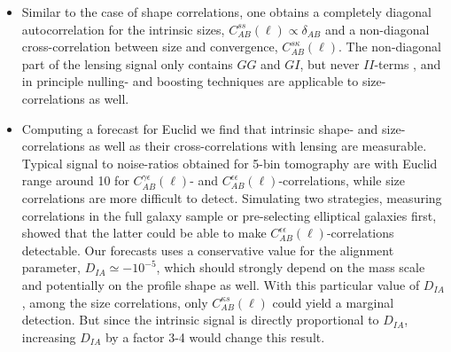 \documentclass[a4paper,fleqn,usenatbib]{mnras}
\begin{document}
\begin{itemize}
\item{Similar to the case of shape correlations, one obtains a completely diagonal autocorrelation for the intrinsic sizes, $C^{ss}_{AB}(\ell)\propto\delta_{AB}$ and a non-diagonal cross-correlation between size and convergence, $C^{s\kappa}_{AB}(\ell)$. The non-diagonal part of the lensing signal only contains $GG$ and $GI$, but never $II$-terms \citep{jain_cross-correlation_2003, takada_tomography_2004, huterer_nulling_2005}, and in principle nulling- and boosting techniques \citep{joachimi_removal_2009, 2010A&A...517A...4J, 2010arXiv1009.2024J} are applicable to size-correlations as well.}

\item{Computing a forecast for Euclid we find that intrinsic shape- and size-correlations as well as their cross-correlations with lensing are measurable. Typical signal to noise-ratios obtained for 5-bin tomography are with Euclid range around 10 for $C^{\gamma\epsilon}_{AB}(\ell)$- and $C^{\epsilon\epsilon}_{AB}(\ell)$-correlations, while size correlations are more difficult to detect. Simulating two strategies, measuring correlations in the full galaxy sample or pre-selecting elliptical galaxies first, showed that the latter could be able to make $C^{\epsilon\epsilon}_{AB}(\ell)$-correlations detectable. Our forecasts uses a conservative value for the alignment parameter, $D_{IA}\simeq -10^{-5}$, which should strongly depend on the mass scale \citep{piras_mass_2018} and potentially on the profile shape as well. With this particular value of $D_{IA}$, among the size correlations, only $C^{\kappa s}_{AB}(\ell)$ could yield a marginal detection. But since the intrinsic signal is directly proportional to $D_{IA}$, increasing $D_{IA}$ by a factor 3-4 would change this result.}


\end{itemize}
\end{document}
